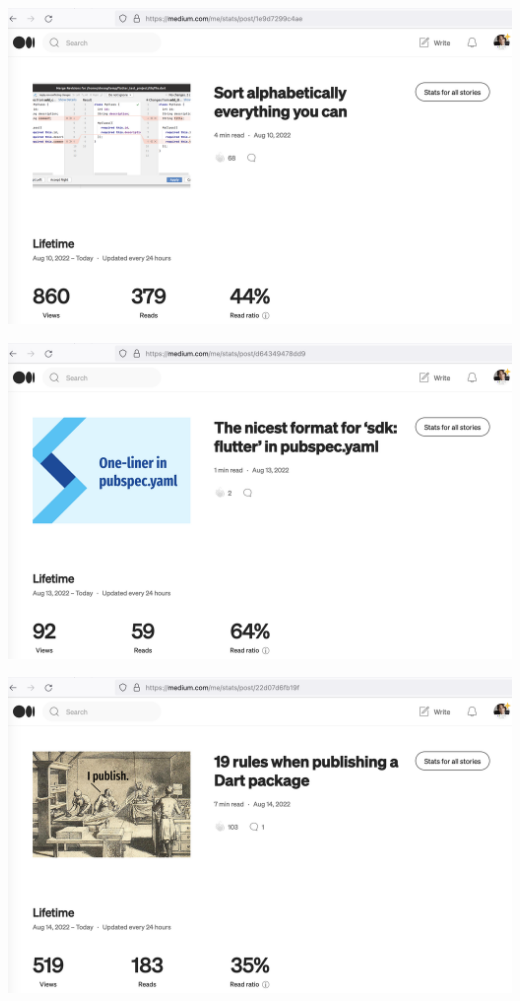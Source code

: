 \begin{center}
    \includegraphics[width=\textwidth]{2022-08-10_sort}
\end{center}

\begin{center}
    \includegraphics[width=\textwidth]{2022-08-13_sdk}
\end{center}

\begin{center}
    \includegraphics[width=\textwidth]{2022-08-14_publish}
\end{center}

